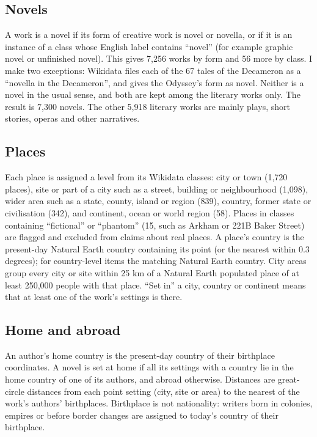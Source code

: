 \documentclass[11pt,a4paper]{article}
\begin{document}
\subsection{Novels}
A work is a novel if its form of creative work is novel or novella, or if it is an instance of a class whose English label contains ``novel'' (for example graphic novel or unfinished novel). This gives 7,256 works by form and 56 more by class. I make two exceptions: Wikidata files each of the 67 tales of the Decameron as a ``novella in the Decameron'', and gives the Odyssey's form as novel. Neither is a novel in the usual sense, and both are kept among the literary works only. The result is 7,300 novels. The other 5,918 literary works are mainly plays, short stories, operas and other narratives.

\subsection{Places}
Each place is assigned a level from its Wikidata classes: city or town (1,720 places), site or part of a city such as a street, building or neighbourhood (1,098), wider area such as a state, county, island or region (839), country, former state or civilisation (342), and continent, ocean or world region (58). Places in classes containing ``fictional'' or ``phantom'' (15, such as Arkham or 221B Baker Street) are flagged and excluded from claims about real places. A place's country is the present-day Natural Earth country containing its point (or the nearest within 0.3 degrees); for country-level items the matching Natural Earth country. City areas group every city or site within 25 km of a Natural Earth populated place of at least 250,000 people with that place. ``Set in'' a city, country or continent means that at least one of the work's settings is there.

\subsection{Home and abroad}
An author's home country is the present-day country of their birthplace coordinates. A novel is set at home if all its settings with a country lie in the home country of one of its authors, and abroad otherwise. Distances are great-circle distances from each point setting (city, site or area) to the nearest of the work's authors' birthplaces. Birthplace is not nationality: writers born in colonies, empires or before border changes are assigned to today's country of their birthplace.
\end{document}
